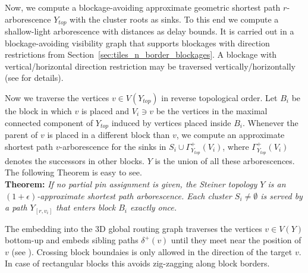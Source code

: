 \documentclass[a2paper]{bigsposter}
\begin{document}
\begin{blockrow}[3]
	
	Now, we compute a  blockage-avoiding approximate geometric shortest path $r$-arborescence $Y_{top}$ with the cluster roots as sinks.
	To this end we compute a shallow-light arborescence \cite{ShallowLight} with distances as delay bounds.
	It is carried out in a  blockage-avoiding visibility graph that supports blockages with direction restrictions from Section~\ref{sec:tiles_n_border_blockages}.
	A blockage with vertical/horizontal direction restriction may be traversed vertically/horizontally (see \cite{bihler-dissertation} for details).
	
	Now we traverse the vertices $v\in V(Y_{top})$ in reverse topological order.
	Let $B_i$ be the block in which $v$ is placed and $V_i\ni v$ be the vertices in the maximal connected component of $Y_{top}$ induced by vertices placed inside $B_i$.
	Whenever the parent of $v$ is placed in a different block than $v$, we compute an approximate shortest path $v$-arborescence for the  sinks in $S_i \cup \Gamma_{Y_{top}}^+(V_i)$,
	where $\Gamma_{Y_{top}}^+(V_i)$ denotes the successors in other blocks.
	$Y$ is the union of all these arborescences. The following Theorem is easy to see.\\
	\textbf{Theorem:}
	\textit{If no partial pin assignment is given, the Steiner topology $Y$ is an  $(1+\epsilon)$-approximate shortest path arborescence.
		Each cluster $S_i\neq \emptyset$ is served by a path $Y_{[r,v_i]}$ that  enters block $B_i$ exactly once.}
	
	The embedding into the 3D global routing graph traverses the vertices $v\in V(Y)$  bottom-up and embeds sibling paths $\delta^+(v)$
	until they meet near the position of $v$ (see \cite{BRGTiming2}).
	Crossing  block boundaies is only allowed in the direction of the target $v$.
	In case of rectangular blocks this avoids zig-zagging along block borders.\\
\end{blockrow}
\end{document}
